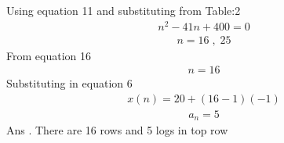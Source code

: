 \documentclass[journal,12pt,twocolumn]{IEEEtran}
\theoremstyle{remark}
\begin{document}
Using equation 11 and substituting from Table:2
\begin{align}n^2-41 n +400 = 0\end{align}
\begin{align}n=16\; ,\;25\end{align}
From equation 16 
\begin{align}n=16\end{align}
Substituting in equation 6
\begin{align}x(n)=20+(16-1)(-1)\end{align}
\begin{align}a_n=5\end{align}
Ans . There are 16 rows and 5 logs in top row 
\end{document}
